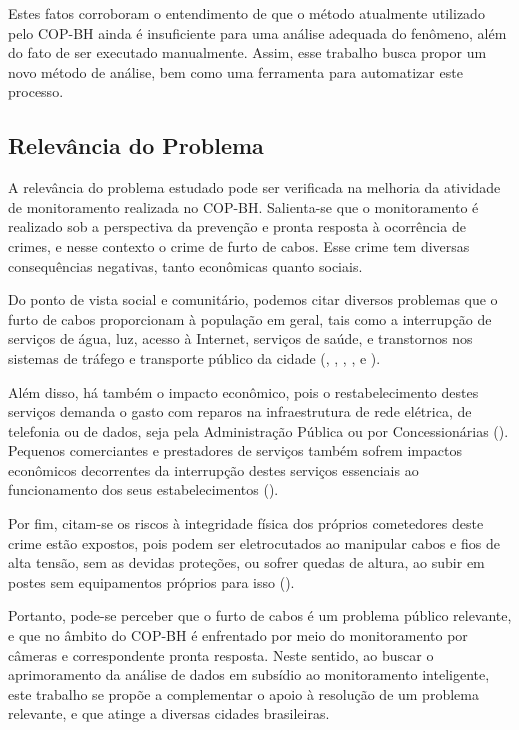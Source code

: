 Estes fatos corroboram o entendimento de que o método atualmente utilizado pelo COP-BH ainda é insuficiente para uma análise adequada do fenômeno, além do fato de ser executado manualmente. Assim, esse trabalho busca propor um novo método de análise, bem como uma ferramenta para automatizar este processo.

\subsection{Relevância do Problema}

A relevância do problema estudado pode ser verificada na melhoria da atividade de monitoramento realizada no COP-BH. Salienta-se que o monitoramento é realizado sob a perspectiva da prevenção e pronta resposta à ocorrência de crimes, e nesse contexto o crime de furto de cabos. Esse crime tem diversas consequências negativas, tanto econômicas quanto sociais.

Do ponto de vista social e comunitário, podemos citar diversos problemas que o furto de cabos proporcionam à população em geral, tais como a interrupção de serviços de água, luz, acesso à Internet, serviços de saúde, e transtornos nos sistemas de tráfego e transporte público da cidade  (, , , ,  e ).  

Além disso, há também o impacto econômico, pois o restabelecimento destes serviços demanda o gasto com reparos na infraestrutura de rede elétrica, de telefonia ou de dados, seja pela Administração Pública ou por Concessionárias (). Pequenos comerciantes e prestadores de serviços também sofrem impactos econômicos decorrentes da interrupção destes serviços essenciais ao funcionamento dos seus estabelecimentos ().

Por fim, citam-se os riscos à integridade física dos próprios cometedores deste crime estão expostos, pois podem ser eletrocutados ao manipular cabos e fios de alta tensão, sem as devidas proteções, ou sofrer quedas de altura, ao subir em postes sem equipamentos próprios para isso (). 

Portanto, pode-se perceber que o furto de cabos é um problema público relevante, e que no âmbito do COP-BH é enfrentado por meio do monitoramento por câmeras e correspondente pronta resposta. Neste sentido, ao buscar o aprimoramento da análise de dados em subsídio ao monitoramento inteligente, este trabalho se propõe a complementar o apoio à resolução de um problema relevante, e que atinge a diversas cidades brasileiras.


